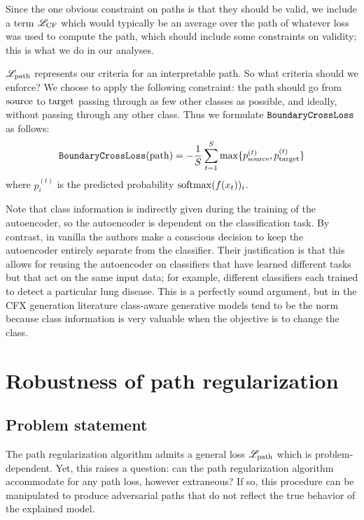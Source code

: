 \documentclass[../main.tex]{subfiles}
\begin{document}
Since the one obvious constraint on paths is that they should be valid, we include a term $\mathscr{L}_\text{CF}$ which would typically be an average over the path of whatever loss was used to compute the path, which should include some constraints on validity; this is what we do in our analyses.

$\mathscr{L}_\text{path}$ represents our criteria for an interpretable path. So what criteria should we enforce?
We choose to apply the following constraint: the path should go from $\mathrm{source}$ to $\mathrm{target}$ passing through as few other classes as possible, and ideally, without passing through any other class.
Thus we formulate $\mathtt{BoundaryCrossLoss}$ as follows:
\begin{align*}
\mathtt{BoundaryCrossLoss}(\mathrm{path}) = -
\frac{1}{S} \sum_{t=1}^{S}
\max \{ p^{(t)}_{\mathrm{source}}, p^{(t)}_{\mathrm{target}} \}
\end{align*}
where $p^{(t)}_i$ is the predicted probability $\mathrm{softmax}(f(x_t))_i$.

Note that class information is indirectly given during the training of the autoencoder, so the autoencoder is dependent on the classification task.
By contrast, in vanilla \ls{} the authors make a conscious decision to keep the autoencoder entirely separate from the classifier.
Their justification is that this allows for reusing the autoencoder on classifiers that have learned different tasks but that act on the same input data; for example, different classifiers each trained to detect a particular lung disease.
This is a perfectly sound argument, but in the CFX generation literature class-aware generative models tend to be the norm because class information is very valuable when the objective is to change the class.

\section{Robustness of path regularization}
\label{methods:robustness}

\subsection{Problem statement}

The path regularization algorithm admits a general loss $\mathscr{L}_\text{path}$ which is problem-dependent.
Yet, this raises a question: can the path regularization algorithm accommodate for any path loss, however extraneous?
If so, this procedure can be manipulated to produce adversarial paths that do not reflect the true behavior of the explained model.
\end{document}
